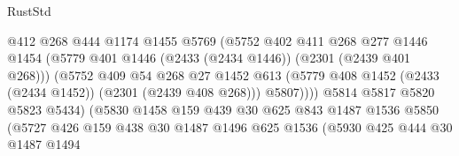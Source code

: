 \begin{lexlean}{RustStd}
\begin{coremodule}
                                    @412
                                    @268
                                    @444
                                    @1174
                                    @1455
                                    @5769
                                    (@5752
                                      @402
                                      @411
                                      @268
                                      @277
                                      @1446
                                      @1454
                                      (@5779
                                        @401
                                        @1446
                                        (@2433 (@2434 @1446))
                                        (@2301 (@2439 @401 @268)))
                                      (@5752
                                        @409
                                        @54
                                        @268
                                        @27
                                        @1452
                                        @613
                                        (@5779
                                          @408
                                          @1452
                                          (@2433 (@2434 @1452))
                                          (@2301 (@2439 @408 @268)))
                                        @5807))))
                                @5814
                                @5817
                                @5820
                                @5823
                                @5434)
                              (@5830
                                @1458
                                @159
                                @439
                                @30
                                @625
                                @843
                                @1487
                                @1536
                                @5850
                                (@5727
                                  @426
                                  @159
                                  @438
                                  @30
                                  @1487
                                  @1496
                                  @625
                                  @1536
                                  (@5930
                                    @425
                                    @444
                                    @30
                                    @1487
                                    @1494

\end{coremodule}
\end{lexlean}
